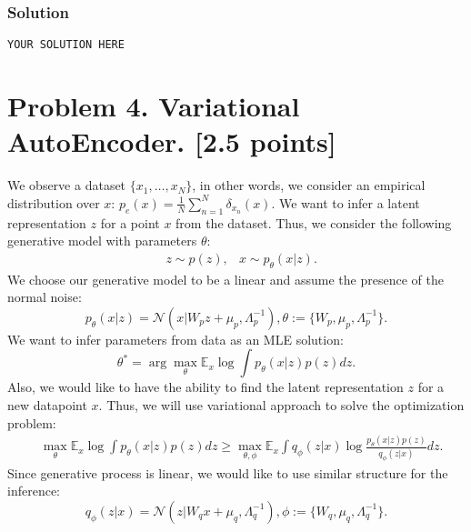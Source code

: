 \documentclass{article}
\begin{document}
\subsubsection*{Solution}
\texttt{YOUR SOLUTION HERE}


\section*{Problem 4. Variational AutoEncoder. [2.5 points]}
We observe a dataset $\{x_1, \dots, x_N\}$, in other words, we consider an empirical distribution over $x$: $p_e(x)=\frac{1}{N}\sum_{n=1}^{N}\delta_{x_n}(x)$. We want to infer a latent representation $z$ for a point $x$ from the dataset. Thus, we consider the following generative model with parameters $\theta$:
\begin{equation}
    \begin{aligned}
    & z \sim p(z),
    & x \sim p_{\theta}(x|z).
    \end{aligned}
\end{equation}
We choose our generative model to be a linear and assume the presence of the normal noise:
\begin{equation}
p_{\theta}(x|z)=\mathcal{N}(x|W_pz+\mu_{p},\Lambda_{p}^{-1}),\theta:=\{W_p, \mu_p, \Lambda_{p}^{-1}\}.
\end{equation}
We want to infer parameters from data as an MLE solution:
\begin{equation}
\theta^{*} = \arg\max_{\theta}\mathbb{E}_{x}\log \int p_{\theta}(x|z)p(z)dz.
\end{equation}
Also, we would like to have the ability to find the latent representation $z$ for a new datapoint $x$. Thus, we will use variational approach to solve the optimization problem:
\begin{equation}
    \begin{aligned}
    &\max_{\theta}\mathbb{E}_{x}\log \int p_{\theta}(x|z)p(z)dz \geq \max_{\theta,\phi}\mathbb{E}_{x}\int q_{\phi}(z|x) \log \frac{p_{\theta}(x|z)p(z)}{q_{\phi}(z|x)}dz.
    \end{aligned}
\end{equation}
Since generative process is linear, we would like to use similar structure for the inference:
\begin{equation}
q_{\phi}(z|x)=\mathcal{N}(z|W_{q}x+\mu_{q},\Lambda_{q}^{-1}),\phi:=\{W_q, \mu_q, \Lambda_{q}^{-1}\}.
\end{equation}
\end{document}
